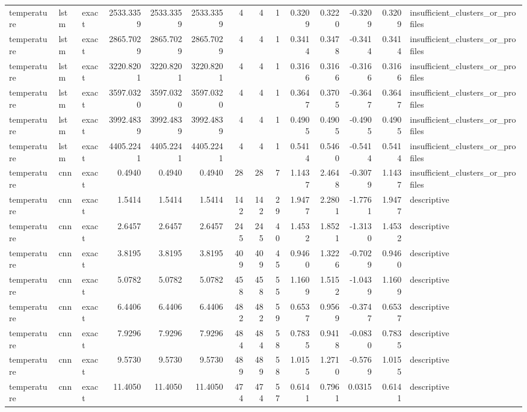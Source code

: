 \begin{tabular}{lllrrrrrrrrrrl}
temperature & lstm & exact & 2533.3359 & 2533.3359 & 2533.3359 & 4 & 4 & 1 & 0.3209 & 0.3220 & -0.3209 & 0.3209 & insufficient_clusters_or_profiles \\
temperature & lstm & exact & 2865.7029 & 2865.7029 & 2865.7029 & 4 & 4 & 1 & 0.3414 & 0.3478 & -0.3414 & 0.3414 & insufficient_clusters_or_profiles \\
temperature & lstm & exact & 3220.8201 & 3220.8201 & 3220.8201 & 4 & 4 & 1 & 0.3166 & 0.3166 & -0.3166 & 0.3166 & insufficient_clusters_or_profiles \\
temperature & lstm & exact & 3597.0320 & 3597.0320 & 3597.0320 & 4 & 4 & 1 & 0.3647 & 0.3705 & -0.3647 & 0.3647 & insufficient_clusters_or_profiles \\
temperature & lstm & exact & 3992.4839 & 3992.4839 & 3992.4839 & 4 & 4 & 1 & 0.4905 & 0.4905 & -0.4905 & 0.4905 & insufficient_clusters_or_profiles \\
temperature & lstm & exact & 4405.2241 & 4405.2241 & 4405.2241 & 4 & 4 & 1 & 0.5414 & 0.5460 & -0.5414 & 0.5414 & insufficient_clusters_or_profiles \\
temperature & cnn & exact & 0.4940 & 0.4940 & 0.4940 & 28 & 28 & 7 & 1.1437 & 2.4648 & -0.3079 & 1.1437 & insufficient_clusters_or_profiles \\
temperature & cnn & exact & 1.5414 & 1.5414 & 1.5414 & 142 & 142 & 29 & 1.9477 & 2.2801 & -1.7761 & 1.9477 & descriptive \\
temperature & cnn & exact & 2.6457 & 2.6457 & 2.6457 & 245 & 245 & 40 & 1.4532 & 1.8521 & -1.3130 & 1.4532 & descriptive \\
temperature & cnn & exact & 3.8195 & 3.8195 & 3.8195 & 409 & 409 & 45 & 0.9460 & 1.3226 & -0.7029 & 0.9460 & descriptive \\
temperature & cnn & exact & 5.0782 & 5.0782 & 5.0782 & 458 & 458 & 55 & 1.1609 & 1.5152 & -1.0439 & 1.1609 & descriptive \\
temperature & cnn & exact & 6.4406 & 6.4406 & 6.4406 & 482 & 482 & 59 & 0.6537 & 0.9569 & -0.3747 & 0.6537 & descriptive \\
temperature & cnn & exact & 7.9296 & 7.9296 & 7.9296 & 484 & 484 & 58 & 0.7835 & 0.9418 & -0.0830 & 0.7835 & descriptive \\
temperature & cnn & exact & 9.5730 & 9.5730 & 9.5730 & 489 & 489 & 58 & 1.0155 & 1.2710 & -0.5769 & 1.0155 & descriptive \\
temperature & cnn & exact & 11.4050 & 11.4050 & 11.4050 & 474 & 474 & 57 & 0.6141 & 0.7961 & 0.0315 & 0.6141 & descriptive \\

\end{tabular}
